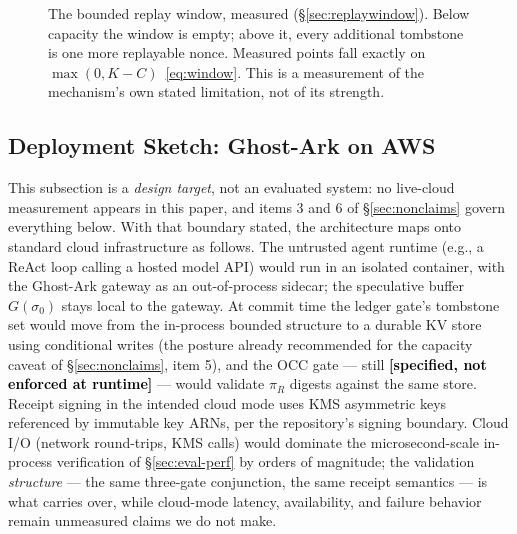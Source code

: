 \documentclass[10pt,twocolumn,letterpaper]{article}
\newcommand{\ghostark}{Ghost-Ark}
\newcommand{\piR}{\pi_R}
\newcommand{\statusspec}[0]{\textcolor{black}{\textbf{[specified, not enforced at runtime]}}}
\begin{document}
\begin{figure}[t]
\centering
{}
\caption{The bounded replay window, measured (\S\ref{sec:replaywindow}). Below
capacity the window is empty; above it, every additional tombstone is one more
replayable nonce. Measured points fall exactly on
$\max(0,K-C)$~\eqref{eq:window}. This is a measurement of the mechanism's own
stated limitation, not of its strength.}
\label{fig:window}
\end{figure}

\subsection{Deployment Sketch: \ghostark{} on AWS}
\label{sec:deployment}

This subsection is a \emph{design target}, not an evaluated system: no
live-cloud measurement appears in this paper, and items 3 and 6 of
\S\ref{sec:nonclaims} govern everything below. With that boundary stated,
the architecture maps onto standard cloud infrastructure as follows. The
untrusted agent runtime (e.g., a ReAct loop calling a hosted model API)
would run in an isolated container, with the \ghostark{} gateway as an
out-of-process sidecar; the speculative buffer $G(\sigma_0)$ stays local to
the gateway. At commit time the ledger gate's tombstone set would move from
the in-process bounded structure to a durable KV store using conditional
writes (the posture already recommended for the capacity caveat of
\S\ref{sec:nonclaims}, item 5), and the OCC gate --- still \statusspec{} ---
would validate $\piR$ digests against the same store. Receipt signing in the
intended cloud mode uses KMS asymmetric keys referenced by immutable key
ARNs, per the repository's signing boundary. Cloud I/O (network round-trips,
KMS calls) would dominate the microsecond-scale in-process
verification of \S\ref{sec:eval-perf} by orders of magnitude; the validation
\emph{structure} --- the same three-gate conjunction, the same receipt
semantics --- is what carries over, while cloud-mode latency, availability,
and failure behavior remain unmeasured claims we do not make.
\end{document}
